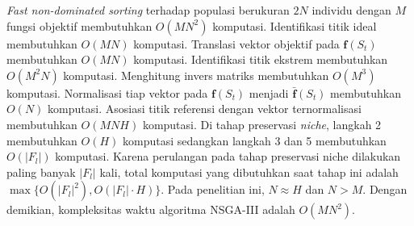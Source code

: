 \textit{Fast non-dominated sorting} terhadap populasi berukuran $2N$ individu dengan $M$ fungsi objektif membutuhkan $O(MN^2)$ komputasi. Identifikasi titik ideal membutuhkan $O(MN)$ komputasi. Translasi vektor objektif pada $\mathbf{f}(S_t)$ membutuhkan $O(MN)$ komputasi. Identifikasi titik ekstrem membutuhkan $O(M^2N)$ komputasi. Menghitung invers matriks membutuhkan $O(M^3)$ komputasi. Normalisasi tiap vektor pada $\mathbf{f}(S_t)$ menjadi $\bar{\mathbf{f}}(S_t)$ membutuhkan $O(N)$ komputasi. Asosiasi titik referensi dengan vektor ternormalisasi membutuhkan $O(MNH)$ komputasi. Di tahap preservasi \textit{niche}, langkah 2 membutuhkan $O(H)$ komputasi sedangkan langkah 3 dan 5 membutuhkan $O(|F_l|)$ komputasi. Karena perulangan pada tahap preservasi niche dilakukan paling banyak $|F_l|$ kali, total komputasi yang dibutuhkan saat tahap ini adalah $\max\{O(|F_l|^2),O(|F_l| \cdot H)\}$. Pada penelitian ini, $N \approx H$ dan $N > M$. Dengan demikian, kompleksitas waktu algoritma NSGA-III adalah $O(MN^2)$.
